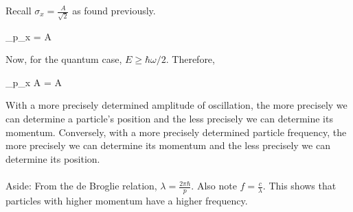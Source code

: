 {\begin{itemize}
		Recall $\sigma_x = \frac{A}{\sqrt{2}}$ as found previously.
		\begin{flalign*}
			\sigma_p\sigma_x = A
		\end{flalign*}
		Now, for the quantum case, $E \geq \hbar \omega/2$. Therefore,
		\begin{flalign*}
			\sigma_p\sigma_x \geq A  = A\frac{\sqrt{\hbar \omega m}}{2}
		\end{flalign*}
		With a more precisely determined amplitude of oscillation, the more precisely we can determine a particle's position and the less precisely we can determine its momentum.
		Conversely, with a more precisely determined particle frequency, the more precisely we can determine its momentum and the less precisely we can determine its position.\\\\
		Aside: From the de Broglie relation, $\lambda = \frac{2\pi \hbar}{p}$. Also note $f = \frac{c}{\lambda}$. This shows that particles with higher momentum have a higher frequency.
	\end{itemize}
}

